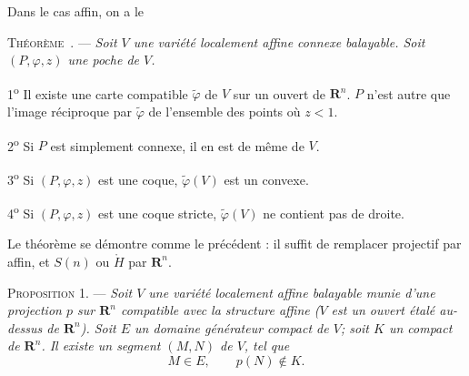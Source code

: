 \documentclass[11pt]{article}
\newcommand{\R}{\boldsymbol{R}}
\newcommand{\bzcf}[2]{#1}
\newcommand{\bznum}[1]{\if\relax\detokenize{#1}\relax\else\ #1\fi}
\newenvironment{prop}[1][]{\par\medskip\noindent\textsc{Proposition #1.} --- \itshape}{\par\medskip}
\newenvironment{theoreme}[1][]{\par\medskip\noindent\textsc{Théorème\bznum{#1}.} --- \itshape}{\par\medskip}
\newenvironment{proof}[1][]{\par}{\par}
\begin{document}
Dans le cas affin, on a le

\begin{theoreme}
Soit $V$ une variété localement affine connexe balayable. Soit $(P, \varphi, z)$ une poche de $V$.

1\textsuperscript{o} Il existe une carte compatible $\tilde{\varphi}$ de $V$ sur un ouvert de
$\R^n$. $P$ n'est autre que l'image réciproque par $\tilde{\varphi}$ de l'ensemble des points où
$z<1$.

2\textsuperscript{o} Si $P$ est simplement connexe, il en est de même de $V$.

3\textsuperscript{o} Si $(P, \varphi, z)$ est une coque, $\tilde{\varphi}(V)$ est un convexe.

4\textsuperscript{o} Si $(P, \varphi, z)$ est une coque stricte, $\tilde{\varphi}(V)$ ne contient
pas de droite.
\end{theoreme}

\begin{proof}
Le théorème se démontre \bzcf{comme le précédent}{\ref{bzthm:c2s3t1_poche_balayable}} : il suffit
de remplacer projectif par affin, et $S(n)$ ou $\mathring{H}$ par $\R^n$.
\end{proof}

\begin{prop}[1]
Soit $V$ une variété localement affine balayable munie d'une projection $p$ sur $\R^n$ compatible
avec la structure affine ($V$ est un ouvert étalé au-dessus de $\R^n$). Soit $E$ un domaine
générateur compact de $V$; soit $K$ un compact de $\R^n$. Il existe un segment $(M, N)$ de $V$,
tel que
\[ M\in E, \qquad p(N)\notin K. \]
\end{prop}
\end{document}
